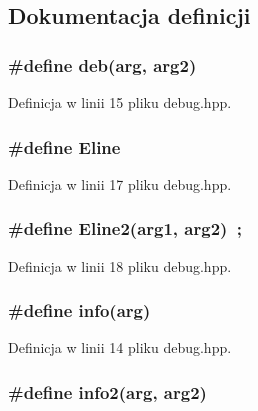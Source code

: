 \subsection{Dokumentacja definicji}
\hypertarget{a00008_21ad5938437ed6d1865dd14c8d1871bc}{
\subsubsection[{deb}]{\setlength{\rightskip}{0pt plus 5cm}\#define deb(arg, \/  arg2)}}
\label{d4/dee/a00008_21ad5938437ed6d1865dd14c8d1871bc}




Definicja w linii 15 pliku debug.hpp.\hypertarget{a00008_9944134306515208e366f3f347ef3653}{
\subsubsection[{Eline}]{\setlength{\rightskip}{0pt plus 5cm}\#define Eline}}
\label{d4/dee/a00008_9944134306515208e366f3f347ef3653}




Definicja w linii 17 pliku debug.hpp.\hypertarget{a00008_68b6fd999967bd748d50fc2014bc5903}{
\subsubsection[{Eline2}]{\setlength{\rightskip}{0pt plus 5cm}\#define Eline2(arg1, \/  arg2)~;}}
\label{d4/dee/a00008_68b6fd999967bd748d50fc2014bc5903}




Definicja w linii 18 pliku debug.hpp.\hypertarget{a00008_590af51ecfed28223c4e6ce02994241a}{
\subsubsection[{info}]{\setlength{\rightskip}{0pt plus 5cm}\#define info(arg)}}
\label{d4/dee/a00008_590af51ecfed28223c4e6ce02994241a}




Definicja w linii 14 pliku debug.hpp.\hypertarget{a00008_51633d6d15647d74f756bcf969fc70ae}{
\subsubsection[{info2}]{\setlength{\rightskip}{0pt plus 5cm}\#define info2(arg, \/  arg2)}}
\label{d4/dee/a00008_51633d6d15647d74f756bcf969fc70ae}




